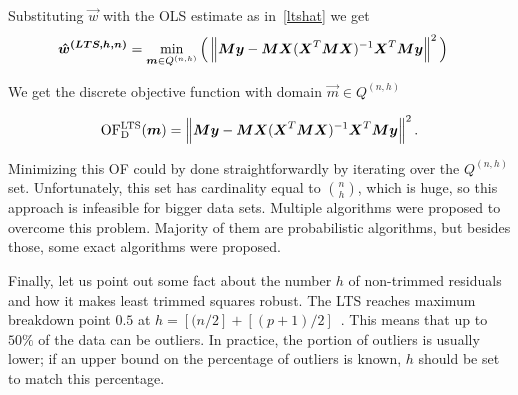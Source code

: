 Substituting $\vec{w}$ with the OLS estimate as in~\eqref{ltshat} we get
\begin{align*}
\boldsymbol{\hat{w}^{(LTS, h, n)}}
&=  \operatorname*{min}_{\boldsymbol{m} \in Q^{(n,h)}} 
    \Big( \left\lVert \boldsymbol{M}\boldsymbol{y} -  \boldsymbol{M}\boldsymbol{X}(\boldsymbol{X}^T\boldsymbol{M}\boldsymbol{X})^{-1}\boldsymbol{X}^T\boldsymbol{M}\boldsymbol{y}  \right\rVert^2 \Big)
\end{align*}

We get the discrete objective function with domain $\vec{m} \in Q^{(n,h)}$

\begin{equation} \label{oflts_discrete}
    \operatorname{OF^{LTS}_D}(\boldsymbol{m}) =  \left\lVert \boldsymbol{M}\boldsymbol{y} -  \boldsymbol{M}\boldsymbol{X}(\boldsymbol{X}^T\boldsymbol{M}\boldsymbol{X})^{-1}\boldsymbol{X}^T\boldsymbol{M}\boldsymbol{y}  \right\rVert^2.
\end{equation}

Minimizing this OF could by done straightforwardly by iterating over the $Q^{(n,h)}$ set. Unfortunately, this set has cardinality equal to $\binom{n}{h}$, which is huge, so this approach is infeasible for bigger data sets. Multiple algorithms were proposed to overcome this problem. Majority of them are probabilistic algorithms, but besides those, some exact algorithms were proposed. 

Finally, let us point out some fact about the number $h$ of non-trimmed residuals and how it makes least trimmed squares robust.
The LTS reaches maximum breakdown point $0.5$ at $h = [(n/2] + [(p+1)/2]$~\cite{agullo2001new}.
This means that up to $50\%$ of the data can be outliers. In practice, the portion of outliers is usually lower; if an upper bound on the percentage of outliers is known,  $h$ should be set to match this percentage.